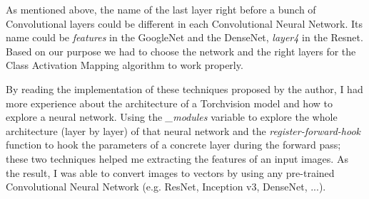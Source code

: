 As mentioned above, the name of the last layer right before a bunch of Convolutional layers could be different in each Convolutional Neural Network. Its name could be  \emph{features} in the GoogleNet\cite{googlenet} and the DenseNet, \emph{layer4} in the Resnet. Based on our purpose we had to choose the network and the right layers for the Class Activation Mapping algorithm to work properly.

By reading the implementation of these techniques proposed by the author, I had more experience about the architecture of a Torchvision model and how to explore a neural network. Using the \emph{\_modules} variable to explore the whole architecture (layer by layer) of that neural network and the \emph{register-forward-hook} function to hook the parameters of a concrete layer during the forward pass; these two techniques helped me extracting the features of an input images. As the result, I was able to convert images to vectors by using any pre-trained Convolutional Neural Network (e.g. ResNet, Inception v3, DenseNet, ...).